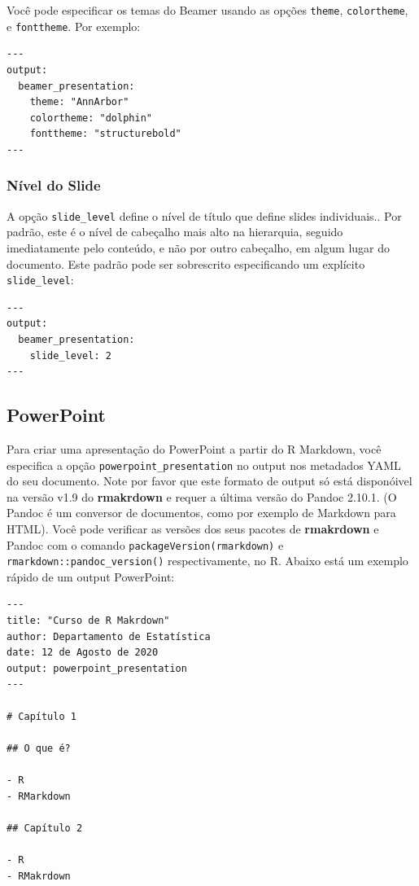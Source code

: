 \documentclass[
]{book}
\begin{document}
Você pode especificar os temas do Beamer usando as opções \texttt{theme}, \texttt{colortheme}, e \texttt{fonttheme}. Por exemplo:

\begin{verbatim}
---
output:
  beamer_presentation:
    theme: "AnnArbor"
    colortheme: "dolphin"
    fonttheme: "structurebold"
---
\end{verbatim}

\hypertarget{nuxedvel-do-slide}{%
\subsubsection*{Nível do Slide}\label{nuxedvel-do-slide}}

A opção \texttt{slide\_level} define o nível de título que define slides individuais.. Por padrão, este é o nível de cabeçalho mais alto na hierarquia, seguido imediatamente pelo conteúdo, e não por outro cabeçalho, em algum lugar do documento. Este padrão pode ser sobrescrito especificando um explícito \texttt{slide\_level}:

\begin{verbatim}
---
output:
  beamer_presentation:
    slide_level: 2
---
\end{verbatim}

\hypertarget{powerpoint}{%
\subsection{PowerPoint}\label{powerpoint}}

Para criar uma apresentação do PowerPoint a partir do R Markdown, você especifica a opção \texttt{powerpoint\_presentation} no output nos metadados YAML do seu documento. Note por favor que este formato de output só está disponóivel na versão v1.9 do \textbf{rmakrdown} e requer a última versão do Pandoc 2.10.1. (O Pandoc é um conversor de documentos, como por exemplo de Markdown para HTML). Você pode verificar as versões dos seus pacotes de \textbf{rmakrdown} e Pandoc com o comando \texttt{packageVersion(\textquotesingle{}rmarkdown\textquotesingle{})} e \texttt{rmarkdown::pandoc\_version()} respectivamente, no R.
Abaixo está um exemplo rápido de um output PowerPoint:

\begin{verbatim}
---
title: "Curso de R Makrdown"
author: Departamento de Estatística
date: 12 de Agosto de 2020
output: powerpoint_presentation
---

# Capítulo 1

## O que é?

- R
- RMarkdown

## Capítulo 2

- R
- RMakrdown
\end{verbatim}
\end{document}
